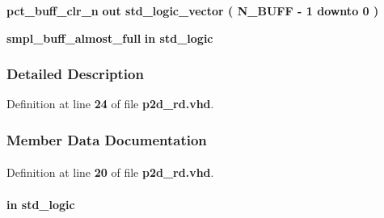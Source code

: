 \begin{DoxyCompactItemize}
\item 
{\bf pct\+\_\+buff\+\_\+clr\+\_\+n}  {\bfseries {\bfseries \textcolor{keywordflow}{out}\textcolor{vhdlchar}{ }}} {\bfseries \textcolor{comment}{std\+\_\+logic\+\_\+vector}\textcolor{vhdlchar}{ }\textcolor{vhdlchar}{(}\textcolor{vhdlchar}{ }\textcolor{vhdlchar}{ }\textcolor{vhdlchar}{ }\textcolor{vhdlchar}{ }{\bfseries {\bf N\+\_\+\+B\+U\+FF}} \textcolor{vhdlchar}{-\/}\textcolor{vhdlchar}{ } \textcolor{vhdldigit}{1} \textcolor{vhdlchar}{ }\textcolor{keywordflow}{downto}\textcolor{vhdlchar}{ }\textcolor{vhdlchar}{ } \textcolor{vhdldigit}{0} \textcolor{vhdlchar}{ }\textcolor{vhdlchar}{)}\textcolor{vhdlchar}{ }} 
\item 
{\bf smpl\+\_\+buff\+\_\+almost\+\_\+full}  {\bfseries {\bfseries \textcolor{keywordflow}{in}\textcolor{vhdlchar}{ }}} {\bfseries \textcolor{comment}{std\+\_\+logic}\textcolor{vhdlchar}{ }} 
\end{DoxyCompactItemize}


\subsubsection{Detailed Description}


Definition at line {\bf 24} of file {\bf p2d\+\_\+rd.\+vhd}.



\subsubsection{Member Data Documentation}
\paragraph[{ all }]{\hspace{0.3cm}{\ttfamily [Package]}}\label{classp2d__rd_a470a86ce8776f637b0483eabf2d92ad2}


Definition at line {\bf 20} of file {\bf p2d\+\_\+rd.\+vhd}.

\paragraph[{clk}]{ {\bfseries \textcolor{keywordflow}{in}\textcolor{vhdlchar}{ }} {\bfseries \textcolor{comment}{std\+\_\+logic}\textcolor{vhdlchar}{ }} \hspace{0.3cm}{\ttfamily [Port]}}\label{classp2d__rd_a4a4609c199d30b3adebbeb3a01276ec5}


